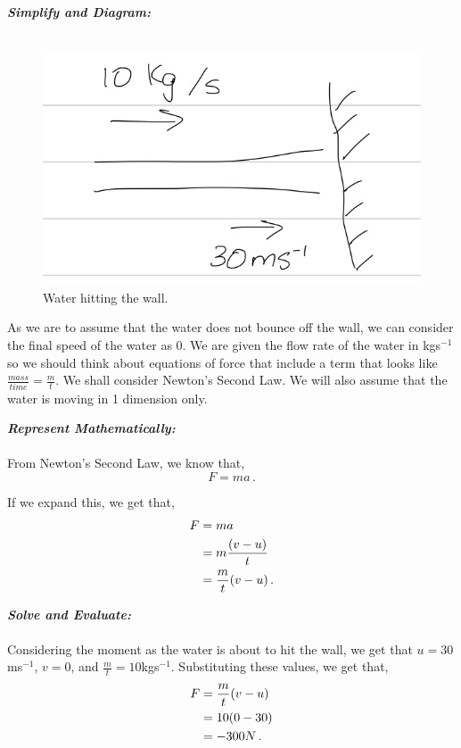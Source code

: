 \begin{subquestions}
\textbf{\textit{Simplify and Diagram:}} \\ \\
\begin{figure}[H]
	\begin{center}
		\includegraphics[scale=0.25]{../2015/figures/2015q6-1}
		\caption{\label{2015:q6:fig:Diagram1} Water hitting the wall.}
	\end{center}
\end{figure}	
As we are to assume that the water does not bounce off the wall, we can consider the final speed of the water as 0. We are given the flow rate of the water in kgs$^{-1}$ so we should think about equations of force that include a term that looks like $\frac{mass}{time}=\frac{m}{t}$. We shall consider Newton's Second Law. We will also assume that the water is moving in 1 dimension only.
	
	
	
	
\textbf{\textit{Represent Mathematically:}} \\ \\
From Newton's Second Law, we know that, 
\begin{equation}
	F=ma \,.
\end{equation}
	
If we expand this, we get that,
\begin{align}
	F & = ma \nonumber \\
	  & = m\frac{(v-u)}{t} \nonumber \\
	  & = \frac{m}{t}(v-u) \,.
\end{align}
	
	
	
	
\textbf{\textit{Solve and Evaluate:}} \\ \\
Considering the moment as the water is about to hit the wall, we get that $u=30$ms$^{-1}$, $v=0$, and $\frac{m}{t}=10$kgs$^{-1}$. Substituting these values, we get that,
\begin{align}
	F & = \frac{m}{t}(v-u) \nonumber \\
	  & = 10(0-30) \nonumber \\
	  & = -300N \,.
\end{align}	
	

\end{subquestions}
